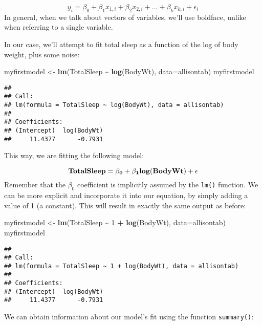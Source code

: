 \documentclass[
]{book}
\newenvironment{Shaded}{\begin{snugshade}}{\end{snugshade}}
\newcommand{\DataTypeTok}[1]{\textcolor[rgb]{0.13,0.29,0.53}{#1}}
\newcommand{\DecValTok}[1]{\textcolor[rgb]{0.00,0.00,0.81}{#1}}
\newcommand{\KeywordTok}[1]{\textcolor[rgb]{0.13,0.29,0.53}{\textbf{#1}}}
\newcommand{\NormalTok}[1]{#1}
\newcommand{\OperatorTok}[1]{\textcolor[rgb]{0.81,0.36,0.00}{\textbf{#1}}}
\newcommand{\StringTok}[1]{\textcolor[rgb]{0.31,0.60,0.02}{#1}}
\begin{document}
\[y_i = \beta_0 + \beta_1 x_{1,i} + \beta_2 x_{2,i} + ... + \beta_k x_{k,i} + \epsilon_i\]
In general, when we talk about vectors of variables, we'll use boldface, unlike when referring to a single variable.

In our case, we'll attempt to fit total sleep as a function of the log of body weight, plus some noise:

\begin{Shaded}
\begin{Highlighting}[]
\NormalTok{myfirstmodel \textless{}{-}}\StringTok{ }\KeywordTok{lm}\NormalTok{(TotalSleep }\OperatorTok{\textasciitilde{}}\StringTok{ }\KeywordTok{log}\NormalTok{(BodyWt), }\DataTypeTok{data=}\NormalTok{allisontab) }
\NormalTok{myfirstmodel}
\end{Highlighting}
\end{Shaded}

\begin{verbatim}
## 
## Call:
## lm(formula = TotalSleep ~ log(BodyWt), data = allisontab)
## 
## Coefficients:
## (Intercept)  log(BodyWt)  
##     11.4377      -0.7931
\end{verbatim}

This way, we are fitting the following model:

\[\bf{TotalSleep} = \beta_0 + \beta_1 \bf{log(BodyWt)} + \bf{\epsilon}\]
Remember that the \(\beta_0\) coefficient is implicitly assumed by the \texttt{lm()} function. We can be more explicit and incorporate it into our equation, by simply adding a value of 1 (a constant). This will result in exactly the same output as before:

\begin{Shaded}
\begin{Highlighting}[]
\NormalTok{myfirstmodel \textless{}{-}}\StringTok{ }\KeywordTok{lm}\NormalTok{(TotalSleep }\OperatorTok{\textasciitilde{}}\StringTok{ }\DecValTok{1} \OperatorTok{+}\StringTok{ }\KeywordTok{log}\NormalTok{(BodyWt), }\DataTypeTok{data=}\NormalTok{allisontab)  }
\NormalTok{myfirstmodel}
\end{Highlighting}
\end{Shaded}

\begin{verbatim}
## 
## Call:
## lm(formula = TotalSleep ~ 1 + log(BodyWt), data = allisontab)
## 
## Coefficients:
## (Intercept)  log(BodyWt)  
##     11.4377      -0.7931
\end{verbatim}

We can obtain information about our model's fit using the function \texttt{summary()}:
\end{document}
